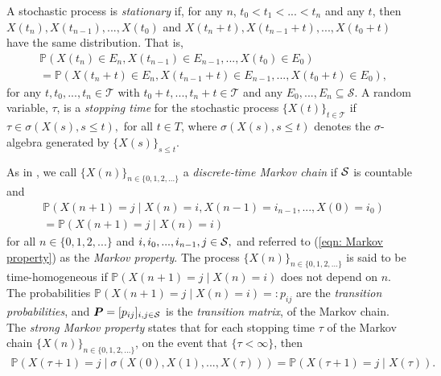A stochastic process is \emph{stationary} if, for any \(n\), \(t_0<t_1<...<t_n\) and any \(t\), then \(X(t_n),X(t_{n-1}),...,X(t_0)\) and \(X(t_n+t),X(t_{n-1}+t),...,X(t_0+t)\) have the same distribution. That is, 
\begin{align}\label{eqn: stationary}
	&\nonumber\mathbb P(X(t_n)\in E_n,X(t_{n-1})\in E_{n-1},...,X(t_0)\in E_0) 
	\\&= \mathbb P(X(t_n+t)\in E_n,X(t_{n-1}+t)\in E_{n-1},...,X(t_0+t)\in E_0),
\end{align}
for any \(t,t_0,...,t_n\in\mathcal T\) with \(t_0+t,...,t_n+t\in\mathcal T\) and any \(E_0,...,E_n\subseteq \mathcal S\). A random variable, \(\tau\), is a \emph{stopping time} for the stochastic process \(\{X(t)\}_{t\in\mathcal T}\) if \(\tau\in\sigma(X(s), s\leq t),\) for all \(t\in T\), where \(\sigma(X(s), s\leq t)\) denotes the \(\sigma\)-algebra generated by \(\{X(s)\}_{s\leq t}\).

As in \cite[Chapter~1.2]{MEinAP}, we call \(\{X(n)\}_{n\in\{0,1,2,\dots\}}\) a \emph{discrete-time Markov chain} if \(\mathcal{S}\) is countable and
\begin{align}\label{eqn: Markov property}
	\nonumber &\mathbb P(X(n+1)=j \mid X(n)=i,X(n-1)=i_{n-1},...,X(0)=i_0) 
	\\&= \mathbb P(X(n+1)=j \mid X(n)=i) 
\end{align}
for all \(n\in\{0,1,2,...\}\) and \(i,i_0,...,i_{n-1},j\in\mathcal{S},\) and referred to (\ref{eqn: Markov property}) as the \emph{Markov property}. The process \(\{X(n)\}_{n\in\{0,1,2,...\}}\) is said to be time-homogeneous if 
\(\mathbb P(X(n+1)=j \mid X(n)=i)\) does not depend on \(n\). The probabilities \(\mathbb P(X(n+1)=j \mid X(n)=i)=:p_{ij}\) are the \emph{transition probabilities}, and \(\boldsymbol P=[p_{ij}]_{i,j\in\mathcal{S}}\) is the \emph{transition matrix}, of the Markov chain. The \emph{strong Markov property} states that for each stopping time \(\tau\) of the Markov chain \(\{X(n)\}_{n\in\{0,1,2,...\}}\), on the event that \(\{\tau<\infty\}\), then 
\begin{align}\label{eqn: strong Markov property}
	\mathbb P(X(\tau+1)=j \mid \sigma(X(0),X(1),...,X(\tau))) = \mathbb P(X(\tau+1)=j \mid X(\tau)).
\end{align}

